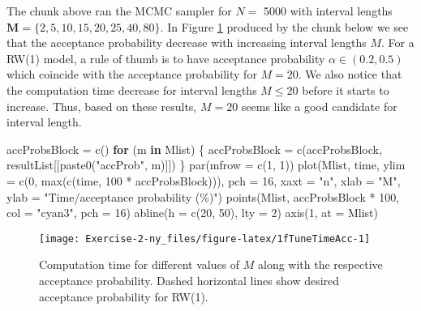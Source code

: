 \documentclass[
]{article}
\newenvironment{Shaded}{\begin{snugshade}}{\end{snugshade}}
\newcommand{\AttributeTok}[1]{\textcolor[rgb]{0.77,0.63,0.00}{#1}}
\newcommand{\ControlFlowTok}[1]{\textcolor[rgb]{0.13,0.29,0.53}{\textbf{#1}}}
\newcommand{\DecValTok}[1]{\textcolor[rgb]{0.00,0.00,0.81}{#1}}
\newcommand{\FunctionTok}[1]{\textcolor[rgb]{0.00,0.00,0.00}{#1}}
\newcommand{\NormalTok}[1]{#1}
\newcommand{\OtherTok}[1]{\textcolor[rgb]{0.56,0.35,0.01}{#1}}
\newcommand{\SpecialCharTok}[1]{\textcolor[rgb]{0.00,0.00,0.00}{#1}}
\newcommand{\StringTok}[1]{\textcolor[rgb]{0.31,0.60,0.02}{#1}}
\begin{document}
The chunk above ran the MCMC sampler for \(N=\) 5000 with interval lengths \(\boldsymbol{M}=\{ 2, 5, 10, 15, 20, 25, 40, 80 \}\). In Figure \ref{fig:1fTuneTimeAcc} produced by the chunk below we see that the acceptance probability decrease with increasing interval lengths \(M\). For a RW(1) model, a rule of thumb is to have acceptance probability \(\alpha \in (0.2,0.5)\) which coincide with the acceptance probability for \(M=20\). We also notice that the computation time decrease for interval lengths \(M \leq 20\) before it starts to increase. Thus, based on these results, \(M=20\) seems like a good candidate for interval length.

\begin{Shaded}
\begin{Highlighting}[]
\NormalTok{accProbsBlock }\OtherTok{=} \FunctionTok{c}\NormalTok{()}
\ControlFlowTok{for}\NormalTok{ (m }\ControlFlowTok{in}\NormalTok{ Mlist) \{}
\NormalTok{    accProbsBlock }\OtherTok{=} \FunctionTok{c}\NormalTok{(accProbsBlock, resultList[[}\FunctionTok{paste0}\NormalTok{(}\StringTok{"accProb"}\NormalTok{, m)]])}
\NormalTok{\}}
\FunctionTok{par}\NormalTok{(}\AttributeTok{mfrow =} \FunctionTok{c}\NormalTok{(}\DecValTok{1}\NormalTok{, }\DecValTok{1}\NormalTok{))}
\FunctionTok{plot}\NormalTok{(Mlist, time, }\AttributeTok{ylim =} \FunctionTok{c}\NormalTok{(}\DecValTok{0}\NormalTok{, }\FunctionTok{max}\NormalTok{(}\FunctionTok{c}\NormalTok{(time, }\DecValTok{100} \SpecialCharTok{*}\NormalTok{ accProbsBlock))), }\AttributeTok{pch =} \DecValTok{16}\NormalTok{, }\AttributeTok{xaxt =} \StringTok{"n"}\NormalTok{,}
    \AttributeTok{xlab =} \StringTok{"M"}\NormalTok{, }\AttributeTok{ylab =} \StringTok{"Time/acceptance probability (\%)"}\NormalTok{)}
\FunctionTok{points}\NormalTok{(Mlist, accProbsBlock }\SpecialCharTok{*} \DecValTok{100}\NormalTok{, }\AttributeTok{col =} \StringTok{"cyan3"}\NormalTok{, }\AttributeTok{pch =} \DecValTok{16}\NormalTok{)}
\FunctionTok{abline}\NormalTok{(}\AttributeTok{h =} \FunctionTok{c}\NormalTok{(}\DecValTok{20}\NormalTok{, }\DecValTok{50}\NormalTok{), }\AttributeTok{lty =} \DecValTok{2}\NormalTok{)}
\FunctionTok{axis}\NormalTok{(}\DecValTok{1}\NormalTok{, }\AttributeTok{at =}\NormalTok{ Mlist)}
\end{Highlighting}
\end{Shaded}

\begin{figure}

{\centering \texttt{[image: Exercise-2-ny\_files/figure-latex/1fTuneTimeAcc-1]} 

}

\caption{Computation time for different values of $M$ along with the respective acceptance probability. Dashed horizontal lines show desired acceptance probability for RW(1).}\label{fig:1fTuneTimeAcc}
\end{figure}
\end{document}
